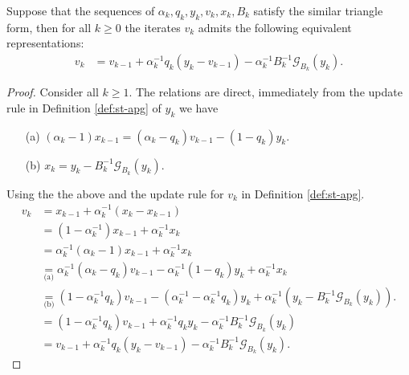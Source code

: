 \documentclass[12pt]{article}
\begin{document}
    \begin{lemma}\label{lemma:st-iterates-alt-form-part1}
        Suppose that the sequences of $\alpha_k, q_k, y_k, v_k, x_k, B_k$ satisfy the similar triangle form, then for all $k \ge 0$ the iterates $v_k$ admits the following equivalent representations: 
        \begin{align*}
            v_k
            &= v_{k - 1} + \alpha_k^{-1}q_k(y_k - v_{k - 1}) - \alpha_{k}^{-1}B_k^{-1}\mathcal G_{B_k}(y_k). 
        \end{align*}
    \end{lemma}
    \begin{proof}
        Consider all $k \ge 1$. 
        The relations are direct, immediately from the update rule in Definition \ref{def:st-apg} of $y_k$ we have
        \begin{enumerate}[nosep]
            \item[(a)] $(\alpha_k - 1)x_{k - 1} = (\alpha_k - q_k)v_{k - 1} - (1 - q_k)y_k$. 
            \item[(b)] $x_k = y_k - B_k^{-1}\mathcal G_{B_k}(y_k)$. 
        \end{enumerate}
        Using the the above and the update rule for $v_k$ in Definition \ref{def:st-apg}. 
        \begin{align*}
            v_k &= x_{k - 1} + \alpha_k^{-1}(x_k - x_{k - 1})
            \\
            &= (1 - \alpha_k^{-1})x_{k - 1} + \alpha_k^{-1}x_k
            \\
            &= \alpha_k^{-1}(\alpha_k - 1)x_{k - 1} + \alpha_k^{-1}x_k
            \\
            &\underset{\text{(a)}}{=} \alpha_k^{-1}(\alpha_k - q_k)v_{k - 1} - \alpha_{k}^{-1}(1 - q_k)y_k 
            + \alpha_k^{-1}x_k
            \\
            &\underset{\text{(b)}}{=} (1 - \alpha_k^{-1}q_k) v_{k - 1} - (\alpha_k^{-1} - \alpha_k^{-1}q_k)y_k
            + \alpha_k^{-1}(y_k - B_k^{-1}\mathcal G_{B_k}(y_k)). 
            \\
            &= 
            (1 - \alpha_k^{-1}q_k) v_{k - 1} + \alpha_k^{-1}q_ky_k
            - \alpha_k^{-1}B_k^{-1}\mathcal G_{B_k}(y_k)
            \\
            &= v_{k - 1} + \alpha_k^{-1}q_k(y_k - v_{k - 1}) - \alpha_{k}^{-1}B_k^{-1}\mathcal G_{B_k}(y_k). 
        \end{align*}
    \end{proof}
\end{document}
